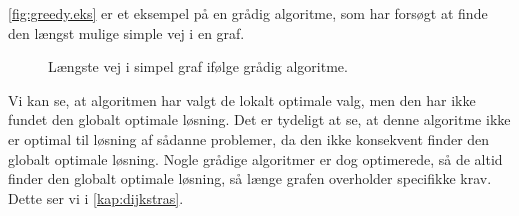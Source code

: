 \autoref{fig:greedy.eks} er et eksempel på en grådig algoritme, som har forsøgt at finde den længst mulige simple vej i en graf.

\begin{figure}[H]
\centering
	\caption{Længste vej i simpel graf ifølge grådig algoritme.}
	\label{fig:greedy.eks}
\end{figure}

Vi kan se, at algoritmen har valgt de lokalt optimale valg, men den har ikke fundet den globalt optimale løsning. Det er tydeligt at se, at denne algoritme ikke er optimal til løsning af sådanne problemer, da den ikke konsekvent finder den globalt optimale løsning. Nogle grådige algoritmer er dog optimerede, så de altid finder den globalt optimale løsning, så længe grafen overholder specifikke krav. Dette ser vi i \autoref{kap:dijkstras}.

